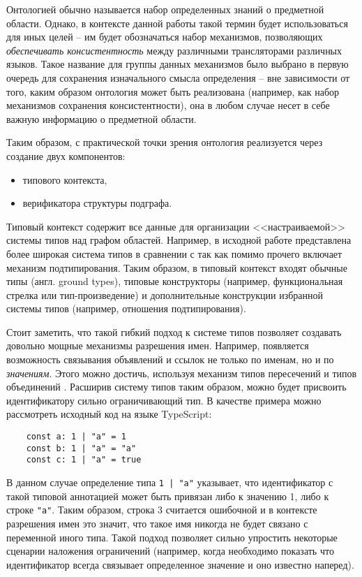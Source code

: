 Онтологией обычно называется набор определенных знаний о предметной области.
Однако, в контексте данной работы такой термин будет использоваться для иных целей -- им будет
обозначаться набор механизмов, позволяющих \textit{обеспечивать консистентность} между различными
трансляторами различных языков. Такое название для группы данных механизмов было выбрано
в первую очередь для сохранения изначального смысла определения -- вне зависимости от того,
каким образом онтология может быть реализована (например, как набор механизмов сохранения консистентности),
она в любом случае несет в себе важную информацию о предметной области.

Таким образом, с практической точки зрения онтология реализуется через создание двух компонентов:
\begin{itemize}
    \item типового контекста,
    \item верификатора структуры подграфа.
\end{itemize}

Типовый контекст содержит все данные для организации <<настраиваемой>> системы типов над графом областей.
Например, в исходной работе \cite{scope-graphs-typed}
представлена более широкая система типов в сравнении с \cite{scope-graphs-static-analysis} так как помимо прочего включает
механизм подтипирования. Таким образом, в типовый контекст входят обычные типы (англ. ground types), типовые конструкторы
(например, функциональная стрелка или тип-произведение) и дополнительные конструкции избранной системы типов (например, отношения подтипирования).

Стоит заметить, что такой гибкий подход к системе типов позволяет создавать довольно мощные механизмы разрешения имен. Например,
появляется возможность связывания объявлений и ссылок не только по именам, но и по \textit{значениям}. Этого можно достичь, используя
механизм типов пересечений и типов объединений \cite{DEZANICIANCAGLINI1992303}.
Расширив систему типов таким образом, можно будет присвоить идентификатору сильно ограничивающий тип. В качестве примера можно рассмотреть
исходный код на языке TypeScript:
\begin{verbatim}
    const a: 1 | "a" = 1
    const b: 1 | "a" = "a"
    const c: 1 | "a" = true
\end{verbatim}

В данном случае определение типа \texttt{1 | "a"} указывает, что идентификатор с такой типовой аннотацией может быть
привязан либо к значению 1, либо к строке \texttt{"a"}. Таким образом, строка 3 считается ошибочной и в контексте
разрешения имен это значит, что такое имя никогда не будет связано с переменной иного типа. Такой подход позволяет
сильно упростить некоторые сценарии наложения ограничений (например, когда необходимо показать что идентификатор всегда связывает
определенное значение и оно известно наперед).


